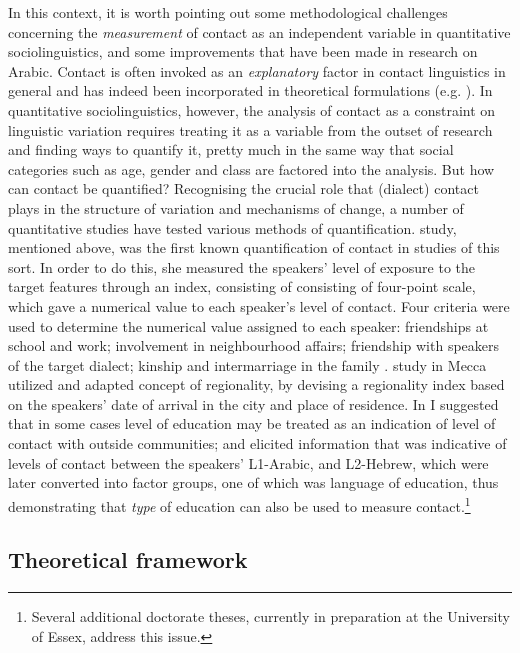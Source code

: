 \documentclass[output=paper]{langsci/langscibook}
\begin{document}
In this context, it is worth pointing out some methodological challenges concerning the \textit{measurement} of contact as an independent variable in quantitative sociolinguistics, and some improvements that have been made in research on Arabic. Contact is often invoked as an \textit{explanatory} factor in contact linguistics in general and has indeed been incorporated in theoretical formulations (e.g. \citealt{ThomasonKaufman1988}). In quantitative sociolinguistics, however, the analysis of contact as a constraint on linguistic variation requires treating it as a variable from the outset of research and finding ways to quantify it, pretty much in the same way that social categories such as age, gender and class are factored into the analysis. But how can contact be quantified? Recognising the crucial role that (dialect) contact plays in the structure of variation and mechanisms of change, a number of quantitative studies have tested various methods of quantification.  study, mentioned above, was the first known quantification of contact in studies of this sort. In order to do this, she measured the speakers’ level of exposure to the target features through an index, consisting of consisting of four-point scale, which gave a numerical value to each speaker’s level of contact. Four criteria were used to determine the numerical value assigned to each speaker: friendships at school and work; involvement in neighbourhood affairs; friendship with speakers of the target dialect; kinship and intermarriage in the family \citep[208]{Al-Essa2009}.  study in Mecca utilized and adapted  concept of regionality, by devising a regionality index based on the speakers’ date of arrival in the city and place of residence. In \citet{Al-Wer2002} I suggested that in some cases level of education may be treated as an indication of level of contact with outside communities; and \citet{Horesh2014} elicited information that was indicative of levels of contact between the speakers’ L1-Arabic, and L2-Hebrew, which were later converted into factor groups, one of which was language of education, thus demonstrating that \textit{type} of education can also be used to measure contact.\footnote{Several additional doctorate theses, currently in preparation at the University of Essex, address this issue.}

\subsection{Theoretical framework}
\end{document}
